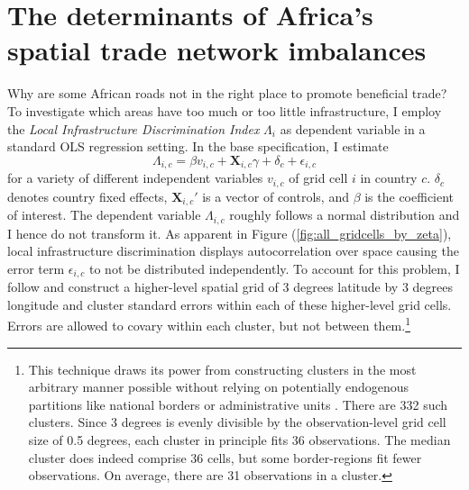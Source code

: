 \documentclass[11pt, oneside]{article}   	%
\let\oldref\ref
\renewcommand{\ref}[1]{(\oldref{#1})}
\begin{document}
\section{The determinants of Africa's spatial trade network imbalances}
\label{chap:results}
Why are some African roads not in the right place to promote beneficial trade? To investigate which areas have too much or too little infrastructure, I employ the \emph{Local Infrastructure Discrimination Index} $\Lambda_{i}$ as dependent variable in a standard OLS regression setting. In the base specification, I estimate
\begin{equation}
  \Lambda_{i,c} = \beta v_{i,c} + \textbf{X}_{i,c}\gamma + \delta_{c} + \epsilon_{i,c}
  \label{eq:grid_ols}
\end{equation}
for a variety of different independent variables $v_{i,c}$ of grid cell $i$ in country $c$. $\delta_{c}$ denotes country fixed effects, $\textbf{X}_{i,c}'$ is a vector of controls, and $\beta$ is the coefficient of interest. The dependent variable $\Lambda_{i,c}$ roughly follows a normal distribution and I hence do not transform it. As apparent in Figure \ref{fig:all_gridcells_by_zeta}, local infrastructure discrimination displays autocorrelation over space causing the error term $\epsilon_{i,c}$ to not be distributed independently. To account for this problem, I follow \cite{Bester_Inferencedependentdata_2011} and construct a higher-level spatial grid of 3 degrees latitude by 3 degrees longitude and cluster standard errors within each of these higher-level grid cells. Errors are  allowed to covary within each cluster, but not between them.\footnote{This technique draws its power from constructing clusters in the most arbitrary manner possible without relying on potentially endogenous partitions like national borders or administrative units \citep[see e.g.][]{Michaels_ResettingUrbanNetwork_2017}. There are 332 such clusters. Since 3 degrees is evenly divisible by the observation-level grid cell size of 0.5 degrees, each cluster in principle fits 36 observations. The median cluster does indeed comprise 36 cells, but some border-regions fit fewer observations. On average, there are 31 observations in a cluster.}
\end{document}
